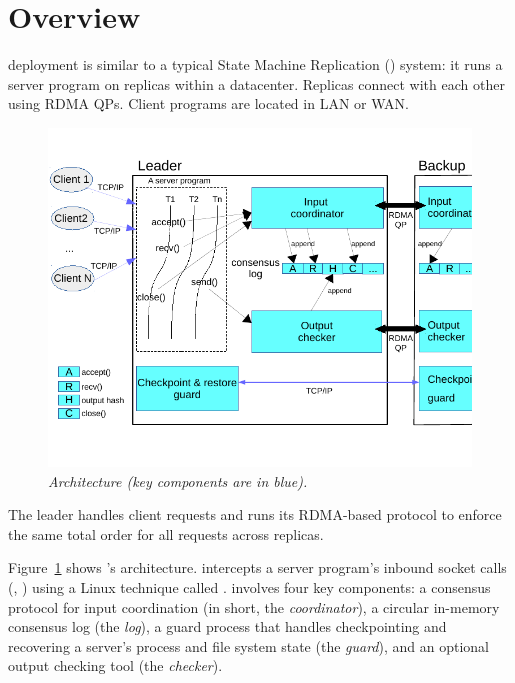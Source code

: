 \section{Overview} \label{sec:overview}


\xxx deployment is similar to a typical State Machine Replication (\smr) 
system: it runs a server program on replicas within a datacenter. Replicas 
connect with each other using RDMA QPs. Client programs are located in LAN or 
WAN.

\begin{figure}[ht]
\begin{center}
\includegraphics{figures/arch}
\caption{\em \xxx Architecture (key components are in
  blue).}\label{fig:arch}
\end{center}
\end{figure}

The \xxx leader handles client requests and runs its RDMA-based protocol to 
enforce the same total order for all requests across replicas.

Figure~\ref{fig:arch} shows \xxx's architecture. \xxx intercepts a server 
program's inbound socket calls (\eg, \recv) using a Linux technique called 
\ldpreload. \xxx involves four key components: a \paxos consensus protocol for 
input coordination (in short, the \emph{coordinator}), a circular in-memory 
consensus log (the \emph{log}), a guard process that handles checkpointing 
and recovering a server's process and file system state (the 
\emph{guard}), and an optional output checking tool (the \emph{checker}).

